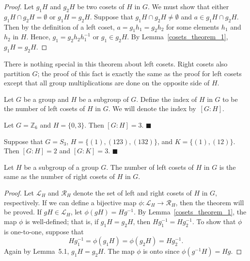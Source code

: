 \begin{proof}
Let $g_1 H$ and $g_2 H$ be two cosets of $H$ in $G$.  We must show that either $g_1 H \cap g_2 H = \emptyset$ or $g_1 H = g_2 H$.  Suppose that $g_1 H \cap g_2 H \neq \emptyset$ and $a \in g_1 H \cap g_2 H$.  Then by the definition of a left coset, $a = g_1 h_1 = g_2 h_2$ for some elements $h_1$ and $h_2$ in $H$.  Hence, $g_1 = g_2 h_2 h_1^{-1}$ or $g_1 \in g_2 H$.  By Lemma~\ref{cosets_theorem_1}, $g_1 H = g_2 H$. 
\end{proof}

\medskip

There is nothing special in this theorem about left cosets.  Right cosets also partition $G$; the proof of this fact is exactly the same as the proof for left cosets except that all group multiplications are done on the opposite side of $H$. 

\medskip

Let $G$ be a group and $H$ be a subgroup of $G$.  Define the {\bfi index\/} of $H$ in $G$ to be the number of left cosets of $H$ in $G$.  We will denote the index by~$[G:H]$\label{indexofasubgroup}.  

\medskip

Let $G= {\mathbb Z}_6$ and $H = \{ 0, 3 \}$. Then $[G:H] = 3$.
\hspace{\fill} $\blacksquare$

\medskip

Suppose that $G= S_3$, $H = \{ (1),(123), (132) \}$, and $K= \{ (1), (12) \}$.  Then $[G:H] = 2$ and $[G:K] = 3$. 
\hspace{\fill} $\blacksquare$

\begin{theorem}\label{cosets_theorem_3}
Let $H$ be a subgroup of a group $G$.  The number of left cosets of $H$ in $G$ is the same as the number of right cosets of $H$ in $G$.  
\end{theorem}

 
\begin{proof}
Let ${\mathcal L}_H$\label{notesetleft} and  ${\mathcal R}_H$\label{notesetright} denote the set of left and right cosets of $H$ in $G$, respectively.  If we can define a bijective map $\phi :  {\mathcal L}_H \rightarrow {\mathcal R}_H$, then the theorem will be proved.  If $gH \in {\mathcal L}_H$, let $\phi( gH ) = Hg^{-1}$.  By Lemma~\ref{cosets_theorem_1}, the map $\phi$ is well-defined; that is, if $g_1 H = g_2 H$, then $H g_1^{-1} = H g_2^{-1}$.  To show that $\phi$ is one-to-one, suppose that 
$$
H g_1^{-1} = \phi( g_1 H ) = \phi( g_2 H ) = H g_2^{-1}.
$$
Again by Lemma~5.1, $g_1 H = g_2 H$.  The map $\phi$ is onto since $\phi(g^{-1} H ) = H g$. 
\mbox{\hspace{1in}}
\end{proof}
 
